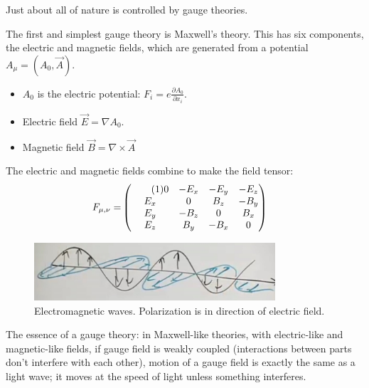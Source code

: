 \documentclass[]{article}
\newcommand\numberthis{\addtocounter{equation}{1}\tag{\theequation}}
\begin{document}
Just about all of nature is controlled by gauge theories.

The first and simplest gauge theory is Maxwell's theory. This has six components, the electric and magnetic fields, which are generated from a potential $A_\mu=(A_0,\vec{A})$.
\begin{itemize}
	\item  $A_0$ is the electric potential: $F_i=e \frac{\partial A_0}{\partial x_i}$.
	\item Electric field $\vec{E}=\nabla A_0$.
	\item Magnetic field $\vec{B}=\nabla \times \vec{A}$
\end{itemize}

The electric and magnetic fields combine to make the field tensor\cite{susskind2017special}:
\begin{align*}
	F_{\mu,\nu} =&\begin{pmatrix} \numberthis \label{eq:field:tensor}
		0&-E_x&-E_y&-E_z\\
		E_x&0&B_z&-B_y\\
		E_y&-B_z&0&B_x\\
		E_z&B_y&-B_x&0
	\end{pmatrix}
\end{align*}

\begin{figure}[H]
	\caption[Electromagnetic waves, illustrating Polarization.]{Electromagnetic waves. Polarization is in direction of electric field.}
	\includegraphics[width=0.8\textwidth]{2-5-EM-field}
\end{figure}

The essence of a gauge theory: in Maxwell-like theories, with electric-like and magnetic-like fields, if gauge field is weakly coupled (interactions between parts don't interfere with each other), motion of a gauge field is exactly the same as a light wave; it moves at the speed of light unless something interferes.
\end{document}
